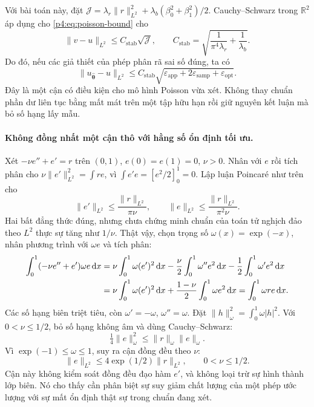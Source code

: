 Với bài toán này, đặt
$\mathcal{J}=\lambda_r\|r\|_{L^2}^2+
\lambda_b(\beta_0^2+\beta_1^2)/2$. Cauchy--Schwarz trong
$\mathbb{R}^2$ áp dụng cho \eqref{p4:eq:poisson-bound} cho
\begin{equation}
 \|v-u\|_{L^2}
 \leq C_{\mathrm{stab}}\sqrt{\mathcal{J}},
 \qquad
 C_{\mathrm{stab}}=
       \sqrt{\frac{1}{\pi^4\lambda_r}+\frac{1}{\lambda_b}}.
 \label{p4:eq:stability-loss}
\end{equation}
Do đó, nếu các giả thiết của phép phân rã sai số đúng, ta có
\begin{equation}
 \|u_{\widehat{\boldsymbol{\theta}}}-u\|_{L^2}
 \leq C_{\mathrm{stab}}
       \sqrt{\varepsilon_{\mathrm{app}}+
                       2\varepsilon_{\mathrm{samp}}+\varepsilon_{\mathrm{opt}}}.
 \label{p4:eq:total-error}
\end{equation}
Đây là một cận có điều kiện cho mô hình Poisson vừa xét. Không thay
chuẩn phần dư liên tục bằng mất mát trên một tập hữu hạn rồi giữ
nguyên kết luận mà bỏ số hạng lấy mẫu.

\paragraph{Không đồng nhất một cận thô với hằng số ổn định tối ưu.}
Xét $-\nu e''+e'=r$ trên $(0,1)$, $e(0)=e(1)=0$, $\nu>0$.
Nhân với $e$ rồi tích phân cho
$\nu\|e'\|_{L^2}^2=\int re$, vì
$\int e'e=[e^2/2]_0^1=0$. Lập luận Poincaré như trên cho
\begin{equation}
 \|e'\|_{L^2}\leq\frac{\|r\|_{L^2}}{\pi\nu},
 \qquad \|e\|_{L^2}\leq\frac{\|r\|_{L^2}}{\pi^2\nu}.
 \label{p4:eq:coarse-convection}
\end{equation}
Hai bất đẳng thức đúng, nhưng chưa chứng minh chuẩn của toán tử nghịch
đảo theo $L^2$ thực sự tăng như $1/\nu$. Thật vậy, chọn trọng số
$\omega(x)=\exp(-x)$, nhân phương trình với $\omega e$ và tích phân:
\begin{align}
 \int_0^1(-\nu e''+e')\omega e\,\mathrm{d}x
 &=\nu\int_0^1\omega(e')^2\,\mathrm{d}x
    -\frac{\nu}{2}\int_0^1\omega''e^2\,\mathrm{d}x
    -\frac12\int_0^1\omega'e^2\,\mathrm{d}x\notag\\
 &=\nu\int_0^1\omega(e')^2\,\mathrm{d}x
    +\frac{1-\nu}{2}\int_0^1\omega e^2\,\mathrm{d}x
 =\int_0^1\omega re\,\mathrm{d}x.
 \label{p4:eq:weighted-energy}
\end{align}
Các số hạng biên triệt tiêu, còn $\omega'=-\omega$,
$\omega''=\omega$. Đặt $\|h\|_\omega^2=\int_0^1\omega|h|^2$.
Với $0<\nu\leq1/2$, bỏ số hạng không âm và dùng Cauchy--Schwarz:
\[
 \tfrac14\|e\|_\omega^2\leq\|r\|_\omega\|e\|_\omega.
\]
Vì $\exp(-1)\leq\omega\leq1$, suy ra cận đồng đều theo $\nu$:
\begin{equation}
 \boxed{\|e\|_{L^2}\leq4\exp(1/2)\|r\|_{L^2},
                       \qquad 0<\nu\leq1/2.}
 \label{p4:eq:uniform-convection}
\end{equation}
Cận này không kiểm soát đồng đều đạo hàm $e'$, và không loại trừ sự
hình thành lớp biên. Nó cho thấy cần phân biệt sự suy giảm chất lượng
của một phép ước lượng với sự mất ổn định thật sự trong chuẩn đang xét.

